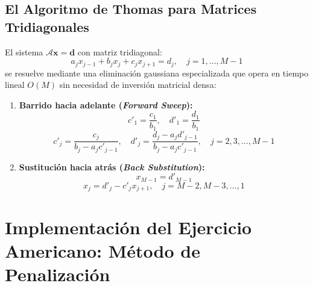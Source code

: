 \documentclass[11pt,a4paper]{article}
\begin{document}
\subsection{El Algoritmo de Thomas para Matrices Tridiagonales}
El sistema $\mathcal{A} \mathbf{x} = \mathbf{d}$ con matriz tridiagonal:
\begin{equation}
    a_j x_{j-1} + b_j x_j + c_j x_{j+1} = d_j, \quad j = 1, \dots, M-1
\end{equation}
se resuelve mediante una eliminación gaussiana especializada que opera en tiempo lineal $O(M)$ sin necesidad de inversión matricial densa:
\begin{enumerate}
    \item \textbf{Barrido hacia adelante (\textit{Forward Sweep}):}
    \begin{equation}
        c'_1 = \frac{c_1}{b_1}, \quad d'_1 = \frac{d_1}{b_1}
    \end{equation}
    \begin{equation}
        c'_j = \frac{c_j}{b_j - a_j c'_{j-1}}, \quad d'_j = \frac{d_j - a_j d'_{j-1}}{b_j - a_j c'_{j-1}}, \quad j = 2, 3, \dots, M-1
    \end{equation}
    \item \textbf{Sustitución hacia atrás (\textit{Back Substitution}):}
    \begin{equation}
        x_{M-1} = d'_{M-1}
    \end{equation}
    \begin{equation}
        x_j = d'_j - c'_j x_{j+1}, \quad j = M-2, M-3, \dots, 1
    \end{equation}
\end{enumerate}

\newpage
\section{Implementación del Ejercicio Americano: Método de Penalización}
\end{document}
